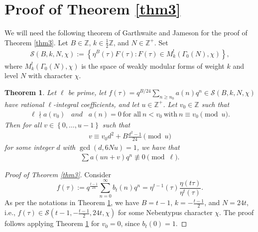 \documentclass[reqno]{amsart}
\newtheorem{theorem}{Theorem}[section]
\theoremstyle{definition}
\theoremstyle{remark}
\numberwithin{equation}{section}
\begin{document}
\section{Proof of Theorem \ref{thm3}}
We will need the following theorem of Garthwaite and Jameson \cite{garthwaite_jameson} for the proof of Theorem \ref{thm3}. Let $B\in \mathbb{Z}$, $k\in \frac{1}{2}\mathbb{Z}$, and $N\in\mathbb{Z}^{+}$. Set
\begin{align*}
\mathcal{S}(B,k,N,\chi):=\left\lbrace\eta^{B}(\tau)F(\tau):F(\tau)\in M^{!}_{k}(\Gamma_{0}(N),\chi) \right\rbrace,
\end{align*}
where $M^{!}_{k}(\Gamma_{0}(N),\chi)$ is the space of weakly modular forms of weight $k$ and level $N$ with character $\chi$.
\begin{theorem}\cite[Theorem 1]{garthwaite_jameson}\label{garthwaite_incong}
Let $\ell$ be prime, let $f(\tau)=q^{B/24}\sum_{n\geq n_0}a(n)q^{n}\in \mathcal{S}(B,k,N,\chi)$ have rational $\ell$-integral coefficients, and let $u\in\mathbb{Z}^{+}$. Let $v_{0}\in \mathbb{Z}$ such that
\begin{align*}
\ell \nmid a(v_{0})\hspace{10pt} and \hspace{10pt}a(n)=0\ \text{for all}\ n<v_0\ \text{with}\ n\equiv v_{0} \pmod{u}.
\end{align*}
Then for all $v\in \left\lbrace0,\ldots,u-1\right\rbrace $ such that
\begin{align*}
v\equiv v_0d^{2}+B\frac{d^{2}-1}{24}\pmod{u}
\end{align*}
for some integer $d$ with $\gcd(d,6Nu)=1$, we have that
\begin{align*}
\sum a(un+v)q^{n}\not\equiv0\pmod{\ell}.
\end{align*}
\end{theorem}	
\begin{proof}[Proof of Theorem \ref{thm3}]
Consider
\begin{equation*}
f(\tau):=q^{\frac{t-1}{24}}\sum_{n=0}^{\infty}b_t(n)q^{n}=\eta^{t-1}(\tau)\frac{\eta(t\tau)}{\eta^{t}(\tau)}.
\end{equation*}
As per the notations in Theorem \ref{garthwaite_incong}, we have $B=t-1$, $k=-\frac{t-1}{2}$, and $N=24t$, i.e., $f(\tau)\in \mathcal{S}(t-1,-\frac{t-1}{2},24t,\chi)$ for some Nebentypus character $\chi$. 
The proof follows applying Theorem \ref{garthwaite_incong} for $v_{0}=0$, since $b_t(0)=1$.
\end{proof}
\end{document}
